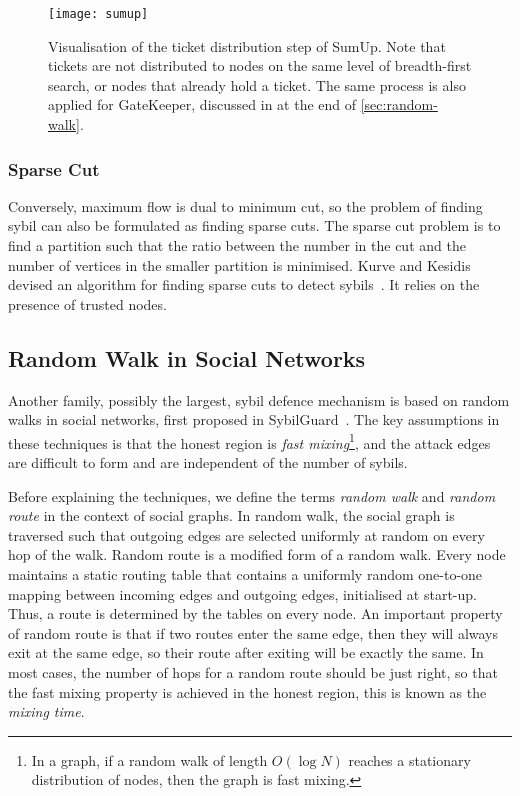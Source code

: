 \begin{figure}
  \centering
  \texttt{[image: sumup]}
  \caption{Visualisation of the ticket distribution step of SumUp. Note that
    tickets are not distributed to nodes on the same level of breadth-first
    search, or nodes that already hold a ticket. The same process is also
    applied for GateKeeper, discussed in at the end of
    \autoref{sec:random-walk}.}
  \label{fig:sumup}
\end{figure}

\subsubsection{Sparse Cut}
Conversely, maximum flow is dual to minimum cut, so the problem of finding sybil
can also be formulated as finding sparse cuts. The sparse cut problem is to find
a partition such that the ratio between the number in the cut and the number of
vertices in the smaller partition is minimised. Kurve and Kesidis devised an
algorithm for finding sparse cuts to detect sybils~\cite{kurve2011sybil}. It
relies on the presence of trusted nodes.

\subsection{Random Walk in Social Networks}\label{sec:random-walk}
Another family, possibly the largest, sybil defence mechanism is based on random
walks in social networks, first proposed in SybilGuard~\cite{yu2006sybilguard}.
The key assumptions in these techniques is that the honest region is \emph{fast
  mixing}\footnote{In a graph, if a random walk of length $O(\log{N})$ reaches a
  stationary distribution of nodes, then the graph is fast mixing.}, and the
attack edges are difficult to form and are independent of the number of sybils.


Before explaining the techniques, we define the terms \emph{random walk} and
\emph{random route} in the context of social graphs. In random walk, the social
graph is traversed such that outgoing edges are selected uniformly at random on
every hop of the walk. Random route is a modified form of a random walk. Every
node maintains a static routing table that contains a uniformly random
one-to-one mapping between incoming edges and outgoing edges, initialised at
start-up. Thus, a route is determined by the tables on every node. An important
property of random route is that if two routes enter the same edge, then they
will always exit at the same edge, so their route after exiting will be exactly
the same. In most cases, the number of hops for a random route should be just
right, so that the fast mixing property is achieved in the honest region, this
is known as the \emph{mixing time}.

